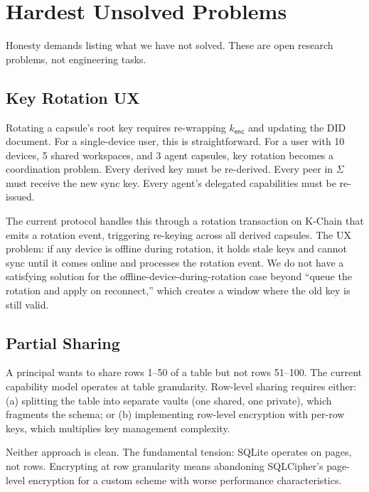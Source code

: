 \section{Hardest Unsolved Problems}
\label{sec:unsolved}

Honesty demands listing what we have not solved. These are open research
problems, not engineering tasks.

\subsection{Key Rotation UX}

Rotating a capsule's root key requires re-wrapping $k_{\mathsf{enc}}$ and
updating the DID document. For a single-device user, this is straightforward.
For a user with 10 devices, 5 shared workspaces, and 3 agent capsules, key
rotation becomes a coordination problem. Every derived key must be re-derived.
Every peer in $\Sigma$ must receive the new sync key. Every agent's delegated
capabilities must be re-issued.

The current protocol handles this through a rotation transaction on K-Chain that
emits a rotation event, triggering re-keying across all derived capsules. The
UX problem: if any device is offline during rotation, it holds stale keys
and cannot sync until it comes online and processes the rotation event. We do
not have a satisfying solution for the offline-device-during-rotation case
beyond ``queue the rotation and apply on reconnect,'' which creates a window
where the old key is still valid.

\subsection{Partial Sharing}

A principal wants to share rows 1--50 of a table but not rows 51--100. The
current capability model operates at table granularity. Row-level sharing
requires either: (a) splitting the table into separate vaults (one shared,
one private), which fragments the schema; or (b) implementing row-level
encryption with per-row keys, which multiplies key management complexity.

Neither approach is clean. The fundamental tension: SQLite operates on pages,
not rows. Encrypting at row granularity means abandoning SQLCipher's
page-level encryption for a custom scheme with worse performance
characteristics.

